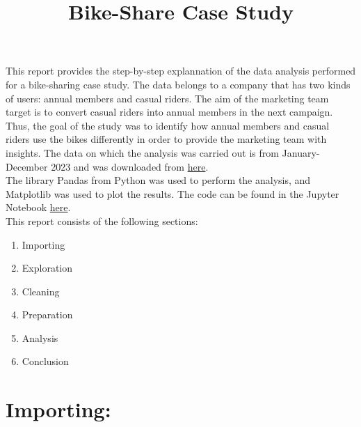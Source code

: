 \documentclass[12pt]{article}
\begin{document}
\title{Bike-Share Case Study}
\date{}
\maketitle

This report provides the step-by-step explannation of the data analysis performed for a bike-sharing case study. The data belongs to a company that has two kinds of users: annual members and casual riders. The aim of the marketing team target is to convert casual riders into annual members in the next campaign. Thus, the goal of the study was to identify how annual members and casual riders use the bikes differently in order to provide the marketing team with insights. The data on which the analysis was carried out is from January-December 2023 and was downloaded from \href{https://divvy-tripdata.s3.amazonaws.com/index.html}{here}. \\

The library Pandas from Python was used to perform the analysis, and Matplotlib was used to plot the results. The code can be found in the Jupyter Notebook \href{https://github.com/SummerKassem/BikeShareCS/blob/main/PythonCode/bike_share_analysis.html}{here}. \\

This report consists of the following sections:
\begin{enumerate}
	\item Importing
	\item Exploration
	\item Cleaning
	\item Preparation
	\item Analysis
	\item Conclusion
\end{enumerate}

\section{Importing:}
\end{document}
